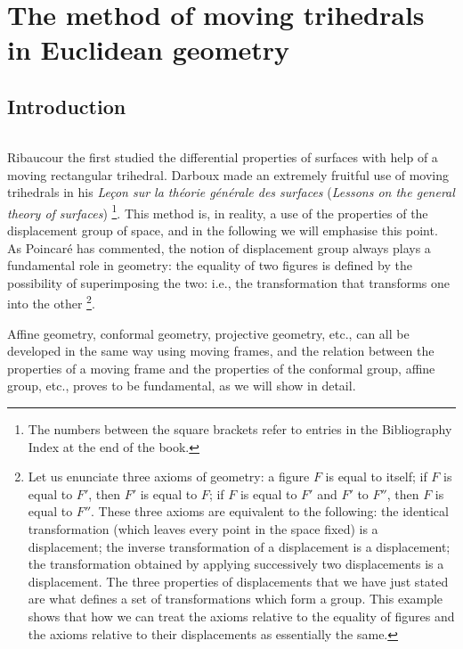 
\part{The method of moving trihedrals in Euclidean geometry}
\label{part:1}

\chapter*{Introduction}
\label{cha:0}

\paragraph{}\label{sec:1} Ribaucour the first studied the differential properties of surfaces with help of a moving rectangular trihedral. Darboux made an extremely fruitful use of moving trihedrals in his \emph{Leçon sur la théorie générale des surfaces} (\emph{Lessons on the general theory of surfaces}) \cite{1}\footnote{The numbers between the square brackets refer to entries in the Bibliography Index at the end of the book.}. This method is, in reality, a use of the properties of the displacement group of space, and in the following we will emphasise this point. As Poincaré has commented, the notion of displacement group always plays a fundamental role in geometry: the equality of two figures is defined by the possibility of superimposing the two: i.e., the transformation that transforms one into the other \footnote{Let us enunciate three axioms of geometry: a figure $F$ is equal to itself; if $F$ is equal to $F'$, then $F'$ is equal to $F$; if $F$ is equal to $F'$ and $F'$ to $F''$, then $F$ is equal to $F''$. These three axioms are equivalent to the following: the identical transformation (which leaves every point in the space fixed) is a displacement; the inverse transformation of a displacement is a displacement; the transformation obtained by applying successively two displacements is a displacement. The three properties of displacements that we have just stated are what defines a set of transformations which form a group. This example shows that how we can treat the axioms relative to the equality of figures and the axioms relative to their displacements as essentially the same.}. 

Affine geometry, conformal geometry, projective geometry, etc., can all be developed in the same way using moving frames, and the relation between the properties of a moving frame and the properties of the conformal group, affine group, etc., proves to be fundamental, as we will show in detail.

